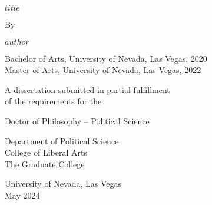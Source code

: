 \begin{titlepage}
    \begin{center}
        \begin{doublespace}
            \MakeUppercase{$title$}
        \end{doublespace}
        
        \vspace{1\baselineskip}
        
        By
        
        $author$
        
        \vspace{1\baselineskip}
        
        Bachelor of Arts, University of Nevada, Las Vegas, 2020\\
        Master of Arts, University of Nevada, Las Vegas, 2022
        
        \vspace{1\baselineskip}
        
        A dissertation submitted in partial fulfillment\\
        of the requirements for the
        
        \vspace{1\baselineskip}
        
        Doctor of Philosophy -- Political Science
        
        \vspace{1\baselineskip}
        
        Department of Political Science\\
        College of Liberal Arts\\
        The Graduate College
        
        \vspace{1\baselineskip}
        
        University of Nevada, Las Vegas\\
        May 2024
    \end{center}
\end{titlepage}